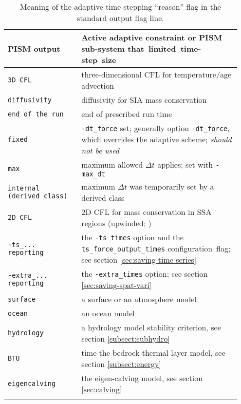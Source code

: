 \begin{table}[ht]
\centering
\begin{tabular}{p{0.3\linewidth}p{0.65\linewidth}}\toprule
  \textbf{PISM output} & \textbf{Active adaptive constraint or PISM sub-system \mbox{that limited time-step size}} \\ \midrule
  \texttt{3D CFL} & three-dimensional CFL for temperature/age advection \cite{BBL} \\
  \texttt{diffusivity} & diffusivity for SIA mass conservation \cite{BBL,HindmarshPayne} \\
  \texttt{end of the run} & end of prescribed run time \\
  \texttt{fixed} & \texttt{-dt_force} set; generally option \texttt{-dt_force}, which overrides the adaptive scheme; \emph{should not be used}  \\
  \texttt{max} & maximum allowed $\Delta t$ applies; set with \texttt{-max_dt} \\
  \texttt{internal (derived class)} & maximum $\Delta t$ was temporarily set by a derived class \\
  \texttt{2D CFL} & 2D CFL for mass conservation in SSA regions (upwinded; \cite{BBssasliding})\\
  \texttt{-ts_... reporting} & the \texttt{-ts_times} option and the \mbox{\texttt{ts_force_output_times}} \mbox{configuration flag}; see section \ref{sec:saving-time-series} \\
  \texttt{-extra_... reporting} & the \texttt{-extra_times} option; see section \ref{sec:saving-spat-vari} \\
  \texttt{surface} & a surface or an atmosphere model \\
  \texttt{ocean} & an ocean model \\
  \texttt{hydrology} & a hydrology model stability criterion, see section \ref{subsect:subhydro} \\
  \texttt{BTU} & time-the bedrock thermal layer model, see section \ref{subsect:energy} \\
  \texttt{eigencalving} & the eigen-calving model, see section \ref{sec:calving} \\
  
  \bottomrule
  \normalsize
\end{tabular}
\caption{Meaning of the adaptive time-stepping ``reason'' flag in the standard output flag line.}
\label{tab:adaptiveflag}
\end{table}


